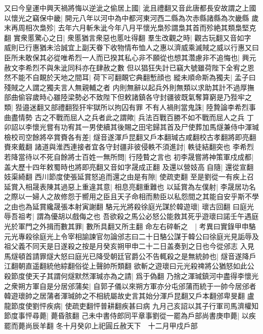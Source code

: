 又曰今皇運中興天禍將悔以逆泚之偷居上國|{
	泚且禮翻又音此唐都長安故謂之上國}
以懷光之竊保中畿|{
	開元八年以河中為中都河東河西二縣為次赤縣諸縣為次畿縣}
歲末再周相次梟殄|{
	去年六月斬朱泚今年八月平懷光梟殄謂梟其首而殄絶其類梟堅克翻}
實衆慝驚心之日|{
	衆慝猶言衆惡也慝吐得翻}
羣生改觀之時|{
	觀古玩翻又音如字}
威則已行惠猶未洽誠宜上副天眷下收物情布恤人之惠以濟威乘滅賊之威以行惠又曰臣所未敢保其必從唯希烈一人而已揆其私心非不願從也想其濳慮非不追悔也|{
	興元赦文李希烈不與朱泚同科亦在肆赦之數}
但以猖狂失計已竊大號雖荷陛下全宥之恩然不能不自靦於天地之間耳|{
	荷下可翻靦它典翻慙顔也}
縱未順命斯為獨夫|{
	孟子曰殘賊之人謂之獨夫言人無親輔之者}
内則無辭以起兵外則無類以求助其計不過厚撫部曲偷容歲時心雖陸梁勢必不致陛下但敕諸鎮各守封疆彼既氣奪算窮是乃狴牢之類|{
	狴邉迷翻又部禮翻狴犴牢獄所以拘囚有罪}
不有人禍則當鬼誅|{
	陸贄論李希烈事曲盡情勢}
古之不戰而屈人之兵者此之謂歟|{
	兵法百戰百勝不如不戰而屈人之兵}
丁卯詔以李懷光嘗有功宥其一男使續其後賜之田宅歸其首及尸使葬加馬燧兼侍中渾瑊檢校司空餘將卒賞賚各有差|{
	燧音遂渾戶昆翻又戶本翻瑊古咸翻校古孝翻將即亮翻賚來戴翻}
諸道與淮西連接者宜各守封疆非彼侵軼不須進討|{
	軼徒結翻突也}
李希烈若降當待以不死自餘將士百姓一無所問|{
	行陸䞇之言也}
初李晟嘗將神策軍戍成都|{
	盖大歷十四年敕蜀時也將即亮翻又音如字晟成正翻}
及還以營妓高自隨|{
	還從宣翻妓渠綺翻}
西川節度使張延賞怒追而還之由是有隙|{
	使疏吏翻}
至是劉從一有疾上召延賞入相晟表陳其過惡上重違其意|{
	相息亮翻重難也}
以延賞為左僕射|{
	李晟居功名之際以一婦人之故修怨于嚮用之臣且天子命相而勲臣以私怨間之其能自安乎斯不學之由也為延賞纔晟張本射寅謝翻}
駱元光將殺徐庭光謀於韓遊瓌|{
	瓌古回翻}
曰庭光辱吾祖考|{
	謂為優胡以戲侮之也}
吾欲殺之馬公必怒公能救其死乎遊瓌曰諾壬午遇庭光於軍門之外揖而數其罪|{
	數所具翻又所主翻}
命左右碎斬之　|{
	考異曰實錄甲申駱元光專殺徐庭光上令宰相諭諫官勿論邠志曰二十日駱公謀于韓公曰徐庭光見詬辱及祖父義不同天是日遂殺之按是月癸亥朔甲申二十二日盖奏到之日也今從邠志}
入見馬燧頓首請罪燧大怒曰庭光已降受朝廷官爵公不告輒殺之是無統帥也|{
	燧音遂降戶江翻朝直遥翻統他綜翻俗從上聲帥所類翻}
欲斬之遊瓌曰元光殺禆將公猶怒如此公殺節度使天子其謂何燧默然渾瑊亦為之請|{
	爲于偽翻}
乃捨之渾瑊鎮河中盡得李懷光之衆朔方軍自是分居邠蒲矣|{
	自郭子儀以來朔方軍亦分屯邠蒲而統于一帥今居邠者韓遊瓌帥之居蒲者渾瑊帥之不相統屬故史言其始分渾戶昆翻又戶本翻邠卑旻翻}
盧龍節度使劉怦疾病|{
	使疏吏翻怦普耕翻疾甚曰病}
九月己亥詔以其子行軍司馬濟權知節度事怦尋薨|{
	薨昏胲翻}
己未中書侍郎同平章事劉從一罷為戶部尚書庚申薨|{
	以疾罷而薨尚辰羊翻}
冬十月癸卯上祀圓丘赦天下　十二月甲戍戶部

